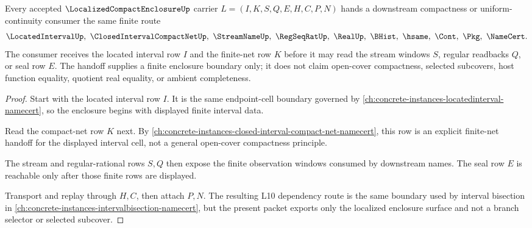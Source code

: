 \begin{theorem}
\label{thm:localized-compact-enclosure-finite-net-handoff}
Every accepted $\LocalizedCompactEnclosureUp$ carrier
$L=(I,K,S,Q,E,H,C,P,N)$ hands a downstream compactness or uniform-continuity consumer the same finite route
$$
\LocatedIntervalUp,\ \ClosedIntervalCompactNetUp,\ \StreamNameUp,\ \RegSeqRatUp,\ \RealUp,\ \BHist,\ \hsame,\ \Cont,\ \Pkg,\ \NameCert .
$$
The consumer receives the located interval row $I$ and the finite-net row $K$ before it may read the stream windows $S$, regular readbacks $Q$, or seal row $E$. The handoff supplies a finite enclosure boundary only; it does not claim open-cover compactness, selected subcovers, host function equality, quotient real equality, or ambient completeness.
\end{theorem}
\begin{proof}
Start with the located interval row $I$. It is the same endpoint-cell boundary governed by \autoref{ch:concrete-instances-locatedinterval-namecert}, so the enclosure begins with displayed finite interval data.

Read the compact-net row $K$ next. By \autoref{ch:concrete-instances-closed-interval-compact-net-namecert}, this row is an explicit finite-net handoff for the displayed interval cell, not a general open-cover compactness principle.

The stream and regular-rational rows $S,Q$ then expose the finite observation windows consumed by downstream names. The seal row $E$ is reachable only after those finite rows are displayed.

Transport and replay through $H,C$, then attach $P,N$. The resulting L10 dependency route is the same boundary used by interval bisection in \autoref{ch:concrete-instances-intervalbisection-namecert}, but the present packet exports only the localized enclosure surface and not a branch selector or selected subcover.
\end{proof}



